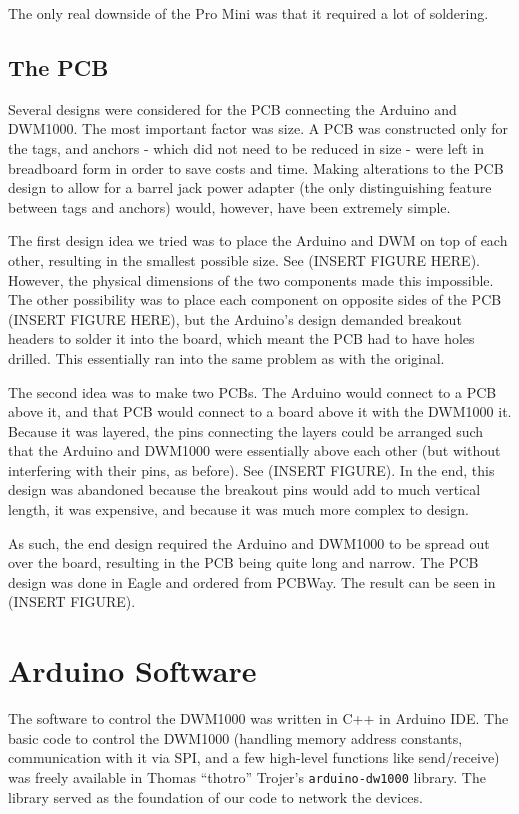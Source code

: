 The only real downside of the Pro Mini was that it required a lot of soldering. 

\subsection{The PCB}
Several designs were considered for the PCB connecting the Arduino and DWM1000. The most important factor was size. A PCB was constructed only for the tags, and anchors - which did not need to be reduced in size - were left in breadboard form in order to save costs and time. Making alterations to the PCB design to allow for a barrel jack power adapter (the only distinguishing feature between tags and anchors) would, however, have been extremely simple.

The first design idea we tried was to place the Arduino and DWM on top of each other, resulting in the smallest possible size. See (INSERT FIGURE HERE). However, the physical dimensions of the two components made this impossible. The other possibility was to place each component on opposite sides of the PCB (INSERT FIGURE HERE), but the Arduino's design demanded breakout headers to solder it into the board, which meant the PCB had to have holes drilled. This essentially ran into the same problem as with the original.

The second idea was to make two PCBs. The Arduino would connect to a PCB above it, and that PCB would connect to a board above it with the DWM1000 it. Because it was layered, the pins connecting the layers could be arranged such that the Arduino and DWM1000 were essentially above each other (but without interfering with their pins, as before). See (INSERT FIGURE). In the end, this design was abandoned because the breakout pins would add to much vertical length, it was expensive, and because it was much more complex to design.

As such, the end design required the Arduino and DWM1000 to be spread out over the board, resulting in the PCB being quite long and narrow. The PCB design was done in Eagle and ordered from PCBWay. The result can be seen in (INSERT FIGURE).

\section{Arduino Software}
The software to control the DWM1000 was written in C++ in Arduino IDE. The basic code to control the DWM1000 (handling memory address constants, communication with it via SPI, and a few high-level functions like send/receive) was freely available in Thomas ``thotro'' Trojer's \texttt{arduino-dw1000} library. The library served as the foundation of our code to network the devices.


